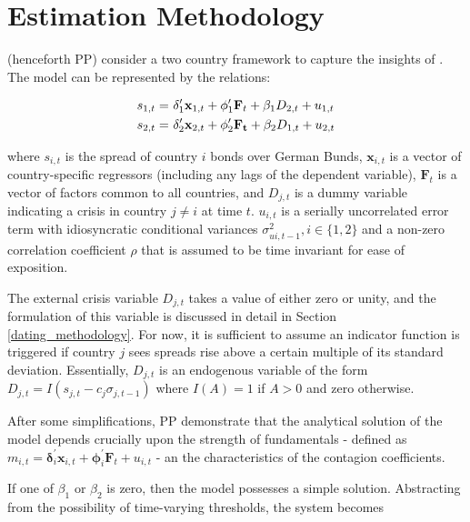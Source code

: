\documentclass[../base.tex]{subfiles}
\begin{document}
\section{Estimation Methodology}
\label{est}

\cite{pesaran2007econometric} (henceforth PP) consider a two country framework to capture the insights of \cite{masson1999contagion}. The model can be represented by the relations:

\begin{align}
	s_{1,t} =&~\mathbf{\delta}_1^{\prime} \mathbf{x}_{1,t} + \mathbf{\phi}_1^{\prime} \mathbf{F}_t + \beta_1 D_{2,t} + u_{1,t} \\
	s_{2,t} =&~\boldmath{\delta}_2^{\prime} \mathbf{x}_{2,t} + \mathbf{\phi}_2^{\prime} \mathbf{F_t} + \beta_2 D_{1,t} + u_{2,t}
\end{align}

where $s_{i,t}$ is the spread of country $i$ bonds over German Bunds, $\mathbf{x}_{i,t}$ is a vector of country-specific regressors (including any lags of the dependent variable), $\mathbf{F}_t$ is a vector of factors common to all countries, and $D_{j, t}$ is a dummy variable indicating a crisis in country $j \neq i$ at time $t$. $u_{i, t}$ is a serially uncorrelated error term with idiosyncratic conditional variances $\sigma^2_{ui, t-1}, i \in \{1, 2\}$ and a non-zero correlation coefficient $\rho$ that is assumed to be time invariant for ease of exposition. 

The external crisis variable $D_{j, t}$ takes a value of either zero or unity, and the formulation of this variable is discussed in detail in Section \ref{dating_methodology}. For now, it is sufficient to assume an indicator function is triggered if country $j$ sees spreads rise above a certain multiple of its standard deviation. Essentially, $D_{j,t}$ is an endogenous variable of the form $D_{j, t} = I(s_{j, t} - c_j \sigma_{j, t-1})$ where $I(A) = 1$ if $A >0$ and zero otherwise.

After some simplifications, PP demonstrate that the analytical solution of the model depends crucially upon the strength of fundamentals - defined as $m_{i,t} = \mathbf{\delta}_i^{\prime} \mathbf{x}_{i,t} + \mathbf{\phi}_i^{\prime} \mathbf{F}_t + u_{i,t}$ - an the characteristics of the contagion coefficients. 

If one of $\beta_1$ or $\beta_2$ is zero, then the model possesses a simple solution. Abstracting from the possibility of time-varying thresholds, the system becomes
\end{document}
